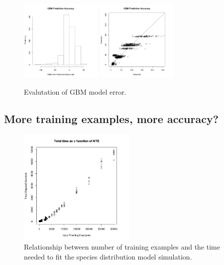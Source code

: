 \documentclass[a4paper]{article}
\begin{document}
\begin{figure}
\begin{centering}
\includegraphics[width=0.35\textwidth]{gbm_hist.png}
\includegraphics[width=0.35\textwidth]{GBM_acc.png}
\caption{\label{fig:gbm_hist} Evalutation of GBM model error.}
\end{centering}
\end{figure}


\subsection{More training examples, more accuracy?}

\begin{figure}
\centering
\includegraphics[width=0.5\textwidth]{nte_time.png}
\caption{Relationship between number of training examples and the time needed to fit the species distribution model simulation.}\label{fig:nte_time}
\end{figure}
\end{document}
